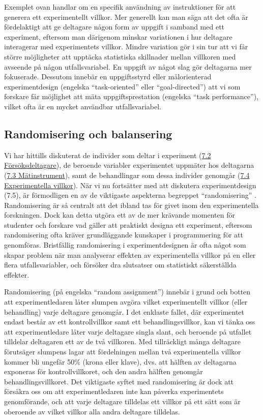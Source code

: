 \documentclass[
]{book}
\begin{document}
Exemplet ovan handlar om en specifik användning av instruktioner för att generera ett experimentellt villkor. Mer generellt kan man säga att det ofta är fördelaktigt att ge deltagare någon form av uppgift i samband med ett experiment, eftersom man därigenom minskar variationen i hur deltagare interagerar med experimentets villkor. Mindre variation gör i sin tur att vi får större möjligheter att upptäcka statistiska skillnader mellan villkoren med avseende på någon utfallsvariabel. En uppgift av något slag gör deltagarna mer fokuserade. Dessutom innebär en uppgiftsstyrd eller målorienterad experimentdesign (engelska ``task-oriented'' eller ``goal-directed'') att vi som forskare får möjlighet att mäta uppgiftsprestation (engelska ``task performance''), vilket ofta är en mycket användbar utfallsvariabel.

\hypertarget{sub07.5.2}{%
\subsection{Randomisering och balansering}\label{sub07.5.2}}

Vi har hittills diskuterat de individer som deltar i experiment (\protect\hyperlink{sec07.2}{7.2 Försöksdeltagare}), de beroende variabler experimentet uppmäter hos deltagarna (\protect\hyperlink{sec07.3}{7.3 Mätinstrument}), samt de behandlingar som dessa individer genomgår (\protect\hyperlink{sec07.4}{7.4 Experimentella villkor}). När vi nu fortsätter med att diskutera experimentdesign (7.5), är förmodligen en av de viktigaste aspekterna begreppet ``randomisering'' \citep{fisher1936design}. Randomisering är så centralt att det ibland tas för givet inom den experimentella forskningen. Dock kan detta utgöra ett av de mer krävande momenten för studenter och forskare vad gäller att praktiskt designa ett experiment, eftersom randomisering ofta kräver grundläggande kunskaper i programmering för att genomföras. Bristfällig randomisering i experimentdesignen är ofta något som skapar problem när man analyserar effekten av experimentella villkor på en eller flera utfallsvariabler, och försöker dra slutsatser om statistiskt säkerställda effekter.

Randomisering (på engelska ``random assignment'') innebär i grund och botten att experimentledaren låter slumpen avgöra vilket experimentellt villkor (eller behandling) varje deltagare genomgår. I det enklaste fallet, där experimentet endast består av ett kontrollvillkor samt ett behandlingsvillkor, kan vi tänka oss att experimentledare låter varje deltagare singla slant, och beroende på utfallet tilldelar deltagaren ett av de två villkoren. Med tillräckligt många deltagare förutsäger slumpens lagar att fördelningen mellan två experimentella villkor kommer bli ungefär 50\% (krona eller klave), dvs. att hälften av deltagarna exponeras för kontrollvillkoret, och den andra hälften genomgår behandlingsvillkoret. Det viktigaste syftet med randomisering är dock att försäkra oss om att experimentledaren inte kan påverka experimentets genomförande, och att varje deltagare tilldelas ett villkor på ett sätt som är oberoende av vilket villkor alla andra deltagare tilldelas.
\end{document}
